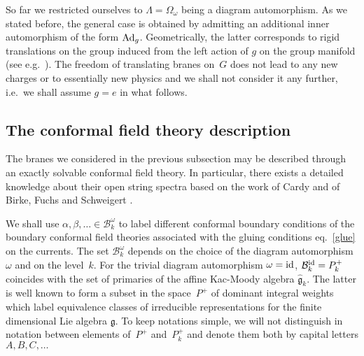\documentclass[12pt,a4paper]{article}
\newcommand{\mf}{\mathfrak} %
\newcommand{\mc}{\mathcal} %
\def\bL{\mc{B}} %
\def\areps{P_k^+} %
\def\reps{P^+} %
\def\tareps{\bL^\omega_k} %
\def\asg{{\hat{\mf{g}}}}
\def\Ad{{\rm Ad}}
\def\id{{\rm id}}
\begin{document}
So far we restricted ourselves to $\Lambda=\Omega_\omega$ being 
a diagram automorphism. As we stated before, the general case 
is obtained by admitting an additional inner automorphism of 
the form $\Ad_g$. Geometrically, the latter corresponds to rigid 
translations on the group induced from the left action of $g$ 
on the group manifold (see e.g.\ \cite{Recknagel:1998ih, Recknagel:1998ut}).
The freedom of 
translating branes on~$G$ does not lead to any new charges or
to essentially new physics and 
we shall not consider it any further, i.e.\ we shall assume 
$g = e$ in what follows. 

\subsection{\label{sc:CFT}The conformal field theory description}

  The branes we considered in the previous subsection may be described
through an exactly solvable conformal field theory. In particular, 
there exists a detailed knowledge about their open string spectra
based on the work of Cardy \cite{Cardy:1989ir} and of Birke, Fuchs 
and Schweigert \cite{Birke:1999ik}. 
\medskip

We shall use $\alpha,\beta,\ldots\in\tareps$ to label
different conformal boundary conditions of the boundary conformal 
field theories associated with the gluing conditions eq.~\eqref{glue}
on the currents. The set $\tareps$ depends on the choice of the diagram
automorphism~$\omega$ and on the level~$k$. For the trivial diagram
automorphism $\omega=\id$, $\bL^\id_k = \areps$ coincides with
the set of primaries of the affine Kac-Moody algebra $\asg_k$. 
The latter is well known to form a subset in the space~$\reps$ 
of dominant integral weights which label equivalence classes of 
irreducible representations for the finite dimensional 
Lie algebra $\mf{g}$. To keep notations simple, we will not 
distinguish in notation between elements of~$\reps$ and~$\areps$
and denote them both by capital letters $A,B,C,\ldots$
\end{document}
